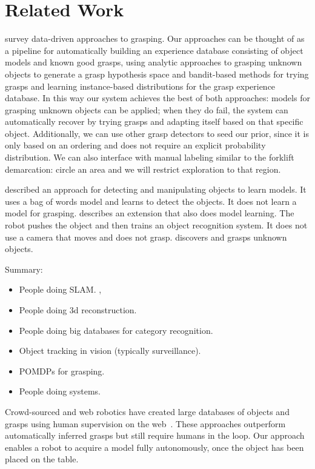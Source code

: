 \documentclass{article}
\begin{document}
\section{Related Work}

\citet{bohg13} survey data-driven approaches to grasping.  Our
approaches can be thought of as a pipeline for automatically building
an experience database consisting of object models and known good
grasps, using analytic approaches to grasping unknown objects to
generate a grasp hypothesis space and bandit-based methods for trying
grasps and learning instance-based distributions for the grasp
experience database.  In this way our system achieves the best of both
approaches: models for grasping unknown objects can be applied; when
they do fail, the system can automatically recover by trying
grasps and adapting itself based on that specific object. Additionally, we
can use other grasp detectors to seed our prior, since it is only based
on an ordering and does not require an explicit probability distribution.
We can also interface with manual labeling similar to the forklift demarcation:
circle an area and we will restrict exploration to that region.

\citet{ude12} described an approach for detecting and manipulating
objects to learn models.  It uses a bag of words model and learns to
detect the objects.  It does not learn a model for grasping.
\citet{schiebener13} describes an extension that also does model
learning.  The robot pushes the object and then trains an object
recognition system.  It does not use a camera that moves and does not
grasp.
\citet{schiebener12} discovers and grasps unknown objects.

Summary: 
\begin{itemize}
\item People doing SLAM.  \citet{wang07, gallagher09}, 
\item People doing 3d reconstruction.   \citet{krainin11, banta00}
\item People doing big databases for category recognition.  \citet{kent14a, kent14, lai11a, goldfeder09}
\item Object tracking in vision (typically surveillance).
\item POMDPs for grasping.  \citet{platt11, hsiao10}
\item People doing systems.  \citet{hudson12, ciocarlie14}
\end{itemize}




Crowd-sourced and web robotics have created large databases of objects
and grasps using human supervision on the web~\citep{kent14a, kent14}.
These approaches outperform automatically inferred grasps but still
require humans in the loop.  Our approach enables a robot to acquire a
model fully autonomously, once the object has been placed on the
table.
\end{document}
